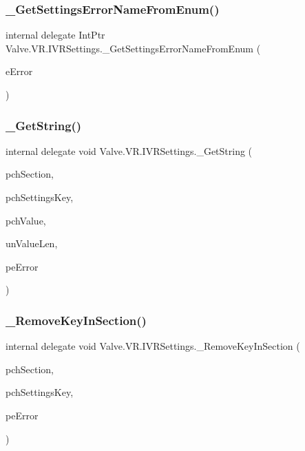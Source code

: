 \subsubsection{\texorpdfstring{\_GetSettingsErrorNameFromEnum()}{\_GetSettingsErrorNameFromEnum()}}
{\footnotesize\ttfamily internal delegate Int\+Ptr Valve.\+V\+R.\+I\+V\+R\+Settings.\+\_\+\+Get\+Settings\+Error\+Name\+From\+Enum (\begin{DoxyParamCaption}\item[{\mbox{\hyperlink{namespace_valve_1_1_v_r_aeab7722b211afc3885ed77faa931291f}{E\+V\+R\+Settings\+Error}}}]{e\+Error }\end{DoxyParamCaption})}

\mbox{\label{struct_valve_1_1_v_r_1_1_i_v_r_settings_a5e71f8b4740ba05ea4fa424674adefbb}} 
\subsubsection{\texorpdfstring{\_GetString()}{\_GetString()}}
{\footnotesize\ttfamily internal delegate void Valve.\+V\+R.\+I\+V\+R\+Settings.\+\_\+\+Get\+String (\begin{DoxyParamCaption}\item[{string}]{pch\+Section,  }\item[{string}]{pch\+Settings\+Key,  }\item[{System.\+Text.\+String\+Builder}]{pch\+Value,  }\item[{uint}]{un\+Value\+Len,  }\item[{ref \mbox{\hyperlink{namespace_valve_1_1_v_r_aeab7722b211afc3885ed77faa931291f}{E\+V\+R\+Settings\+Error}}}]{pe\+Error }\end{DoxyParamCaption})}

\mbox{\label{struct_valve_1_1_v_r_1_1_i_v_r_settings_ae4d9e9b9f88da0eeb2887610e1c5ff89}} 
\subsubsection{\texorpdfstring{\_RemoveKeyInSection()}{\_RemoveKeyInSection()}}
{\footnotesize\ttfamily internal delegate void Valve.\+V\+R.\+I\+V\+R\+Settings.\+\_\+\+Remove\+Key\+In\+Section (\begin{DoxyParamCaption}\item[{string}]{pch\+Section,  }\item[{string}]{pch\+Settings\+Key,  }\item[{ref \mbox{\hyperlink{namespace_valve_1_1_v_r_aeab7722b211afc3885ed77faa931291f}{E\+V\+R\+Settings\+Error}}}]{pe\+Error }\end{DoxyParamCaption})}

